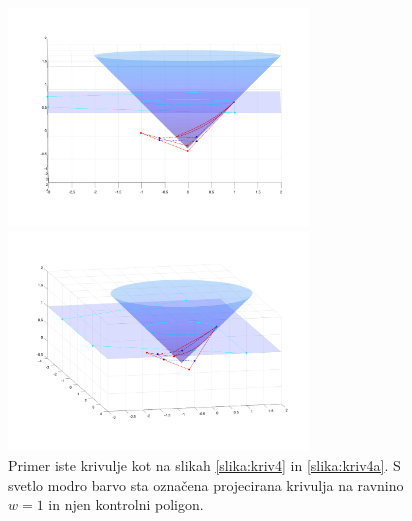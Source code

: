 \documentclass[a4paper,11pt]{article}
\theoremstyle{definition}
\theoremstyle{plain}
\begin{document}
\begin{figure}[ht!]
    \begin{minipage}{0.5\textwidth}
        \centering
        \includegraphics[width=80mm]{kriv4_3a.png}
    \end{minipage}\hfill
    \begin{minipage}{0.5\textwidth}
        \centering
        \includegraphics[width=80mm]{kriv4_3b.png}
    \end{minipage}\hfill
    \caption{Primer iste krivulje kot na slikah \ref{slika:kriv4} in \ref{slika:kriv4a}. S svetlo modro barvo sta označena projecirana krivulja na ravnino $w = 1$ in njen kontrolni poligon.}
\end{figure}


\end{document}
